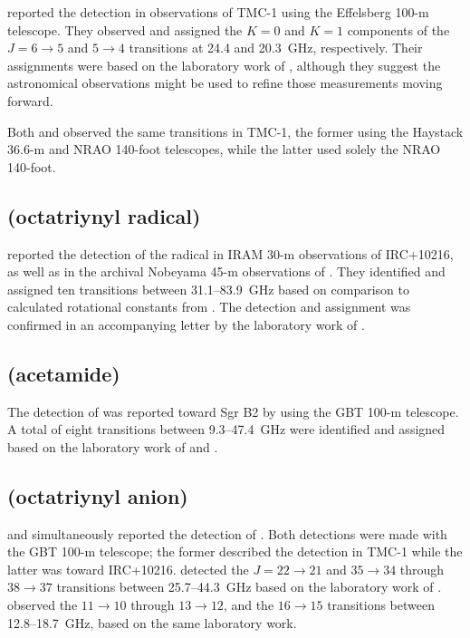 \documentclass[twocolumn]{aastex631}
\begin{document}
	\citet{Walmsley:1984od} reported the detection in observations of TMC-1 using the Effelsberg 100-m telescope. They observed and assigned the $K = 0$ and $K = 1$ components of the $J = 6\rightarrow5$ and $5\rightarrow4$ transitions at 24.4 and 20.3~GHz, respectively.  Their assignments were based on the laboratory work of \citet{Heath:1955fj}, although they suggest the astronomical observations might be used to refine those measurements moving forward.
	
	Both \citet{MacLeod:1984er} and \citet{Loren:1984bc} observed the same transitions in TMC-1, the former using the Haystack 36.6-m and NRAO 140-foot telescopes, while the latter used solely the NRAO 140-foot.
	
	\subsection{ (octatriynyl radical)}
	\label{C8H}
	
	\citet{Cernicharo:1996kd} reported the detection of the  radical in IRAM 30-m observations of IRC+10216, as well as in the archival Nobeyama 45-m observations of \citet{Kawaguchi:1995tx}.  They identified and assigned ten transitions between 31.1--83.9~GHz based on comparison to calculated rotational constants from \citet{Pauzat:1991bx}.  The detection and assignment was confirmed in an accompanying letter by the laboratory work of \citet{McCarthy:1996wx}.
	
	\subsection{ (acetamide)}
	\label{acetamide}
	
	The detection of  was reported toward Sgr B2 by \citet{Hollis:2006uc} using the GBT 100-m telescope.  A total of eight transitions between 9.3--47.4~GHz were identified and assigned based on the laboratory work of \citet{Suenram:2001dx} and \citet{Ilyushin:2004jj}.
	
	\subsection{ (octatriynyl anion)}
	\label{C8H-}
	
	\citet{Brunken:2007fx} and \citet{Remijan:2007vp} simultaneously reported the detection of .  Both detections were made with the GBT 100-m telescope; the former described the detection in TMC-1 while the latter was toward IRC+10216.  \citet{Remijan:2007vp} detected the $J = 22\rightarrow21$ and $35\rightarrow34$ through $38\rightarrow37$ transitions between 25.7--44.3~GHz based on the laboratory work of \citet{Gupta:2007vc}.  \citet{Brunken:2007fx} observed the $11\rightarrow10$ through $13\rightarrow12$, and the $16\rightarrow15$ transitions between 12.8--18.7~GHz, based on the same laboratory work.
	
\end{document}
